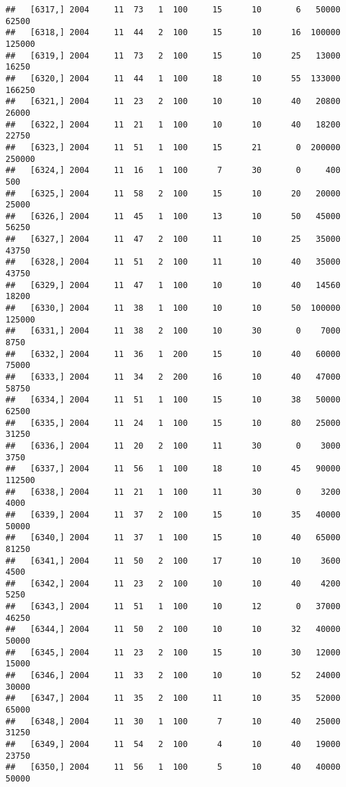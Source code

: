 \documentclass{article}\usepackage[]{graphicx}\usepackage[]{color}
\makeatletter
\newenvironment{kframe}{%
 \def\at@end@of@kframe{}%
 \ifinner\ifhmode%
  \def\at@end@of@kframe{\end{minipage}}%
  \begin{minipage}{\columnwidth}%
 \fi\fi%
 \def\FrameCommand##1{\hskip\@totalleftmargin \hskip-\fboxsep
 \colorbox{shadecolor}{##1}\hskip-\fboxsep
     \hskip-\linewidth \hskip-\@totalleftmargin \hskip\columnwidth}%
 \MakeFramed {\advance\hsize-\width
   \@totalleftmargin\z@ \linewidth\hsize
   \@setminipage}}%
 {\par\unskip\endMakeFramed%
 \at@end@of@kframe}
\newenvironment{knitrout}{}{} %
\makeatother
\begin{document}
\begin{knitrout}
\begin{kframe}
\begin{verbatim}
##   [6317,] 2004     11  73   1  100     15      10       6   50000   62500
##   [6318,] 2004     11  44   2  100     15      10      16  100000  125000
##   [6319,] 2004     11  73   2  100     15      10      25   13000   16250
##   [6320,] 2004     11  44   1  100     18      10      55  133000  166250
##   [6321,] 2004     11  23   2  100     10      10      40   20800   26000
##   [6322,] 2004     11  21   1  100     10      10      40   18200   22750
##   [6323,] 2004     11  51   1  100     15      21       0  200000  250000
##   [6324,] 2004     11  16   1  100      7      30       0     400     500
##   [6325,] 2004     11  58   2  100     15      10      20   20000   25000
##   [6326,] 2004     11  45   1  100     13      10      50   45000   56250
##   [6327,] 2004     11  47   2  100     11      10      25   35000   43750
##   [6328,] 2004     11  51   2  100     11      10      40   35000   43750
##   [6329,] 2004     11  47   1  100     10      10      40   14560   18200
##   [6330,] 2004     11  38   1  100     10      10      50  100000  125000
##   [6331,] 2004     11  38   2  100     10      30       0    7000    8750
##   [6332,] 2004     11  36   1  200     15      10      40   60000   75000
##   [6333,] 2004     11  34   2  200     16      10      40   47000   58750
##   [6334,] 2004     11  51   1  100     15      10      38   50000   62500
##   [6335,] 2004     11  24   1  100     15      10      80   25000   31250
##   [6336,] 2004     11  20   2  100     11      30       0    3000    3750
##   [6337,] 2004     11  56   1  100     18      10      45   90000  112500
##   [6338,] 2004     11  21   1  100     11      30       0    3200    4000
##   [6339,] 2004     11  37   2  100     15      10      35   40000   50000
##   [6340,] 2004     11  37   1  100     15      10      40   65000   81250
##   [6341,] 2004     11  50   2  100     17      10      10    3600    4500
##   [6342,] 2004     11  23   2  100     10      10      40    4200    5250
##   [6343,] 2004     11  51   1  100     10      12       0   37000   46250
##   [6344,] 2004     11  50   2  100     10      10      32   40000   50000
##   [6345,] 2004     11  23   2  100     15      10      30   12000   15000
##   [6346,] 2004     11  33   2  100     10      10      52   24000   30000
##   [6347,] 2004     11  35   2  100     11      10      35   52000   65000
##   [6348,] 2004     11  30   1  100      7      10      40   25000   31250
##   [6349,] 2004     11  54   2  100      4      10      40   19000   23750
##   [6350,] 2004     11  56   1  100      5      10      40   40000   50000

\end{verbatim}
\end{kframe}
\end{knitrout}
\end{document}
